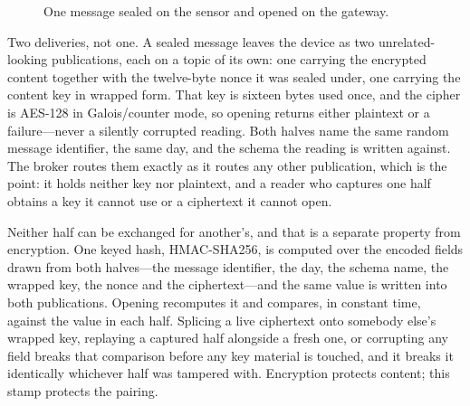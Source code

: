\documentclass[12pt,a4paper]{report}
\begin{document}
\begin{figure}[htbp]
{%
}
\caption{One message sealed on the sensor and opened on the gateway.}
\label{fig:enc-sealopen}
\end{figure}

Two deliveries, not one. A sealed message leaves the device as two
unrelated-looking publications, each on a topic of its own: one carrying the
encrypted content together with the twelve-byte nonce it was sealed under,
one carrying the content key in wrapped form. That key is sixteen bytes used
once, and the cipher is AES-128 in Galois/counter mode, so opening returns
either plaintext or a failure---never a silently corrupted reading. Both
halves name the same random message identifier, the same day, and the schema
the reading is written against. The broker routes them exactly as it routes
any other publication, which is the point: it holds neither key nor
plaintext, and a reader who captures one half obtains a key it cannot use or
a ciphertext it cannot open.

Neither half can be exchanged for another's, and that is a separate property
from encryption. One keyed hash, HMAC-SHA256, is computed over the encoded
fields drawn from both halves---the message identifier, the day, the schema
name, the wrapped key, the nonce and the ciphertext---and the same value is
written into both publications. Opening recomputes it and compares, in
constant time, against the value in each half. Splicing a live ciphertext
onto somebody else's wrapped key, replaying a captured half alongside a fresh
one, or corrupting any field breaks that comparison before any key material
is touched, and it breaks it identically whichever half was tampered with.
Encryption protects content; this stamp protects the pairing.
\end{document}
